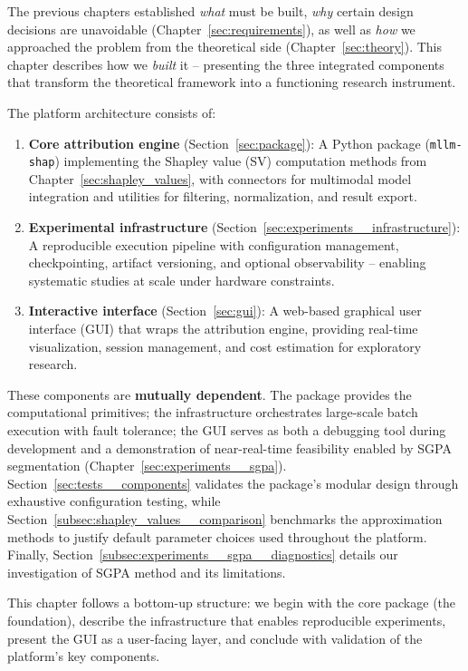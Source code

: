 The previous chapters established \emph{what} must be built, \emph{why} certain design decisions are unavoidable (Chapter~\ref{sec:requirements}), as well as \emph{how} we approached the problem from the theoretical side (Chapter~\ref{sec:theory}). This chapter describes how we \emph{built} it -- presenting the three integrated components that transform the theoretical framework into a functioning research instrument.

The platform architecture consists of:

\begin{enumerate}[nosep]
    \item \textbf{Core attribution engine} (Section~\ref{sec:package}): A Python package (\texttt{mllm-shap}) implementing the Shapley value (SV) computation methods from Chapter~\ref{sec:shapley_values}, with connectors for multimodal model integration and utilities for filtering, normalization, and result export.

    \item \textbf{Experimental infrastructure} (Section~\ref{sec:experiments__infrastructure}): A reproducible execution pipeline with configuration management, checkpointing, artifact versioning, and optional observability -- enabling systematic studies at scale under hardware constraints.

    \item \textbf{Interactive interface} (Section~\ref{sec:gui}): A web-based graphical user interface (GUI) that wraps the attribution engine, providing real-time visualization, session management, and cost estimation for exploratory research.
\end{enumerate}

These components are \textbf{mutually dependent}. The package provides the computational primitives; the infrastructure orchestrates large-scale batch execution with fault tolerance; the GUI serves as both a debugging tool during development and a demonstration of near-real-time feasibility enabled by SGPA segmentation (Chapter~\ref{sec:experiments__sgpa}). Section~\ref{sec:tests__components} validates the package's modular design through exhaustive configuration testing, while Section~\ref{subsec:shapley_values__comparison} benchmarks the approximation methods to justify default parameter choices used throughout the platform. Finally, Section~\ref{subsec:experiments__sgpa__diagnostics} details our investigation of SGPA method and its limitations.

This chapter follows a bottom-up structure: we begin with the core package (the foundation), describe the infrastructure that enables reproducible experiments, present the GUI as a user-facing layer, and conclude with validation of the platform's key components.


